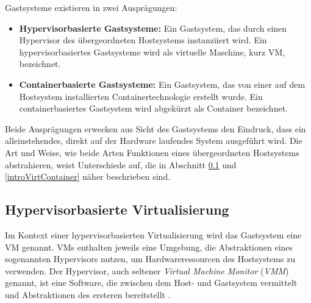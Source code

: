 \documentclass[../main.tex]{subfiles}
\begin{document}
		Gastsysteme existieren in zwei Ausprägungen:
		\begin{itemize}
			\item \textbf{Hypervisorbasierte Gastsysteme:} Ein Gastsystem, das durch einen Hypervisor des übergeordneten Hostsystems instanziiert wird. Ein hypervisorbasiertes Gastsysteme wird als virtuelle Maschine, kurz \acrshort{VM}, bezeichnet.
			\item \textbf{Containerbasierte Gastsysteme:} Ein Gastsystem, das von einer auf dem Hostsystem installierten Containertechnologie erstellt wurde. Ein containerbasiertes Gastsystem wird abgekürzt als Container bezeichnet.
		\end{itemize}

		Beide Ausprägungen erwecken aus Sicht des Gastsystems den Eindruck, dass ein alleinstehendes, direkt auf der Hardware laufendes System ausgeführt wird.	Die Art und Weise, wie beide Arten Funktionen eines übergeordneten Hostsystems abstrahieren, weist Unterschiede auf, die in Abschnitt \ref{introVirtHypervisor} und \ref{introVirtContainer} näher beschrieben sind.






    \subsection{Hypervisorbasierte Virtualisierung}
    \label{introVirtHypervisor}
      Im Kontext einer hypervisorbasierten Virtualisierung wird das Gastsystem eine \acrshort{VM} genannt. \acrshort{VM}s enthalten jeweils eine Umgebung, die Abstraktionen eines sogenannten Hypervisors nutzen, um Hardwareressourcen des Hostsystems zu verwenden. Der Hypervisor, auch seltener \emph{Virtual Machine Monitor} (\emph{VMM}) genannt, ist eine Software, die zwischen dem Host- und Gastsystem vermittelt und Abstraktionen des ersteren bereitstellt \cite[S.6]{dockerBook}\cite[S.2]{containerVirtPerformance}\cite[S.105]{tanenbaumOS}.

\end{document}
